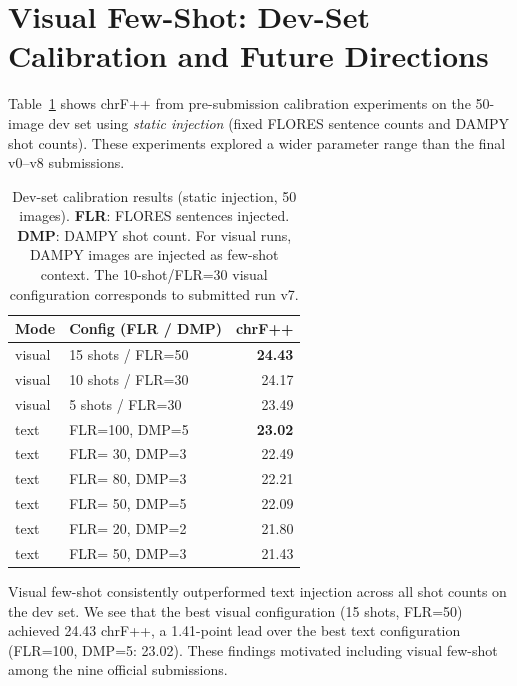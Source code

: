 \documentclass[11pt]{article}
\begin{document}
\section{Visual Few-Shot: Dev-Set Calibration and Future Directions}
\label{app:devset}

Table~\ref{tab:dev_results} shows chrF++ from pre-submission calibration
experiments on the 50-image dev set using \textit{static injection}
(fixed FLORES sentence counts and DAMPY shot counts).
These experiments explored a wider parameter range than the final v0--v8
submissions.

\begin{table}[h]
\centering
\small
\setlength{\tabcolsep}{5pt}
\begin{tabular}{llr}
\toprule
\textbf{Mode} & \textbf{Config (FLR / DMP)} & \textbf{chrF++} \\
\midrule
visual & 15 shots / FLR=50 & \textbf{24.43} \\
visual & 10 shots / FLR=30 & 24.17 \\
visual &  5 shots / FLR=30 & 23.49 \\
\midrule
text   & FLR=100, DMP=5    & \textbf{23.02} \\
text   & FLR= 30, DMP=3    & 22.49 \\
text   & FLR= 80, DMP=3    & 22.21 \\
text   & FLR= 50, DMP=5    & 22.09 \\
text   & FLR= 20, DMP=2    & 21.80 \\
text   & FLR= 50, DMP=3    & 21.43 \\
\bottomrule
\end{tabular}
\caption{Dev-set calibration results (static injection, 50 images).
  \textbf{FLR}: FLORES sentences injected.
  \textbf{DMP}: DAMPY shot count.
  For visual runs, DAMPY images are injected as few-shot context.
  The 10-shot/FLR=30 visual configuration corresponds to submitted run v7.}
\label{tab:dev_results}
\end{table}

Visual few-shot consistently outperformed text injection across all shot
counts on the dev set. We see that the best visual configuration (15 shots, FLR=50)
achieved 24.43 chrF++, a 1.41-point lead over the best text configuration
(FLR=100, DMP=5: 23.02). These findings motivated including visual few-shot
among the nine official submissions.
\end{document}
